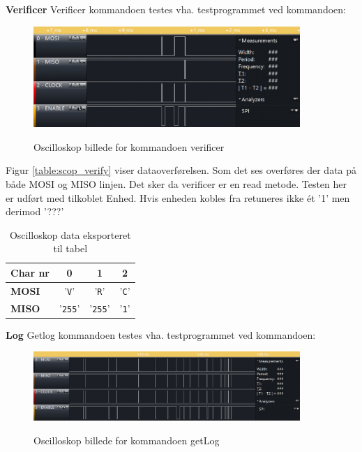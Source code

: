 \textbf{Verificer}
Verificer kommandoen testes vha. testprogrammet ved kommandoen: 


\begin{figure}[h]
\centering
{\includegraphics[width=0.90\textwidth]{filer/modultest/Billeder/verify}}
\caption{Oscilloskop billede for kommandoen verificer}
\label{lab:scop_verify}
\end{figure}

Figur \ref{table:scop_verify} viser dataoverførelsen. Som det ses overføres der data på både MOSI og MISO linjen. Det sker da verificer er en read metode. Testen her er udført med tilkoblet Enhed. Hvis enheden kobles fra retuneres ikke ét '1' men derimod '???' 
 

\begin{table}[h]
	\caption{Oscilloskop data eksporteret til tabel}
	\centering
	\begin{tabular}{|l|c|c|c|}
		\hline 
		\textbf{Char nr} & \textbf{0} & \textbf{1} & \textbf{2}\\ 		
		\hline 
		\textbf{MOSI} & '\verb+V+' & '\verb+R+'  & '\verb+C+'\\ 
		\hline 
		\textbf{MISO} & '\verb+255+' & '\verb+255+' & '\verb+1+' \\ 
		\hline 
	\end{tabular} 
	\label{table:scop_verifify}
\end{table}


\textbf{Log}
Getlog kommandoen testes vha. testprogrammet ved kommandoen: 


\begin{figure}[h]
\centering
{\includegraphics[width=0.90\textwidth]{filer/modultest/Billeder/getlog_and_error}}
\caption{Oscilloskop billede for kommandoen getLog}
\label{lab:scop_getlog}
\end{figure}

